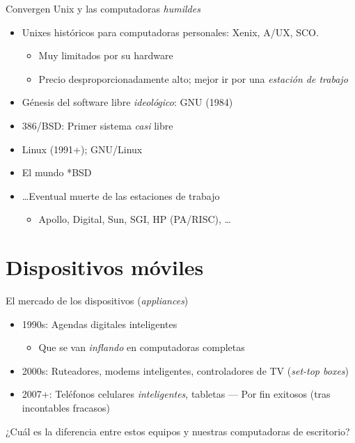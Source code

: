\documentclass[presentation]{beamer}
\begin{document}
\begin{frame}[label={sec:orgc6f3e6e}]{Convergen Unix y las computadoras \emph{humildes}}
\begin{itemize}
\item Unixes históricos para computadoras personales: Xenix, A/UX, SCO.
\begin{itemize}
\item Muy limitados por su hardware
\item Precio desproporcionadamente alto; mejor ir por una \emph{estación de
trabajo}
\end{itemize}
\item Génesis del software libre \emph{ideológico}: GNU (1984)
\item 386/BSD: Primer sistema \emph{casi} libre
\item Linux (1991+); GNU/Linux
\item El mundo *BSD
\item \ldots{}Eventual muerte de las estaciones de trabajo
\begin{itemize}
\item Apollo, Digital, Sun, SGI, HP (PA/RISC), …
\end{itemize}
\end{itemize}
\end{frame}

\section{Dispositivos móviles}
\label{sec:orgd52164d}
\begin{frame}[label={sec:orgc15fd37}]{El mercado de los dispositivos (\emph{appliances})}
\begin{itemize}
\item 1990s: Agendas digitales inteligentes
\begin{itemize}
\item Que se van \emph{inflando} en computadoras completas
\end{itemize}
\item 2000s: Ruteadores, modems inteligentes, controladores de TV
(\emph{set-top boxes})
\item 2007+: Teléfonos celulares \emph{inteligentes}, tabletas — Por fin
exitosos (tras incontables fracasos)
\end{itemize}
\begin{center}
¿Cuál es la diferencia entre estos equipos y nuestras computadoras de
escritorio?
\end{center}
\end{frame}
\end{document}
